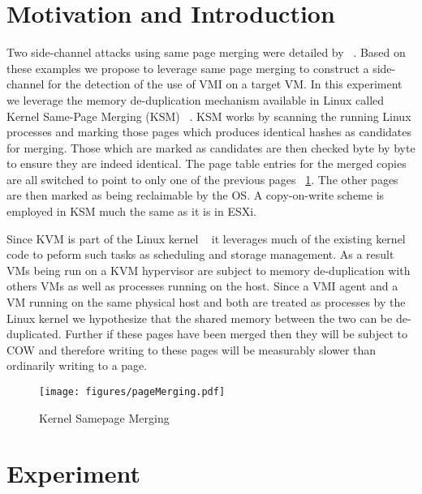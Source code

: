 \label{PageMergeChap}

\section{Motivation and Introduction}\label{PageMergeChap-intro}

Two side-channel attacks using same page merging were detailed by ~\cite{owens_non-interactive_2011,xiao_security_2013}. Based on these examples we propose to leverage same page merging to construct a side-channel for the detection of the use of VMI on a target VM.  In this experiment we leverage the memory de-duplication mechanism available in Linux called Kernel Same-Page Merging (KSM) ~\cite{arcangeli_increasing_2009}. KSM works by scanning the running Linux processes and marking those pages which produces identical hashes as candidates for merging. Those which are marked as candidates are then checked byte by byte to ensure they are indeed identical. The page table entries for the merged copies are all switched to point to only one of the previous pages ~\ref{PageMerge}. The other pages are then marked as being reclaimable by the OS. A copy-on-write scheme is employed in KSM much the same as it is in ESXi.

Since KVM is part of the Linux kernel ~\cite{_Linux_archive} it leverages much of the existing kernel code to peform such tasks as scheduling and storage management. As a result VMs being run on a KVM hypervisor are subject to memory de-duplication with others VMs as well as processes running on the host. Since a VMI agent and a VM running on the same physical host and both are treated as processes by the Linux kernel we hypothesize that the shared memory between the two can be de-duplicated. Further if these pages have been merged then they will be subject to COW and therefore writing to these pages will be measurably slower than ordinarily writing to a page.


\begin{figure}\label{PageMerge}
	  \centering
	  \texttt{[image: figures/pageMerging.pdf]}
	  \caption{Kernel Samepage Merging}
\end{figure}



\section{Experiment}\label{PageMergeChap-Exp}

